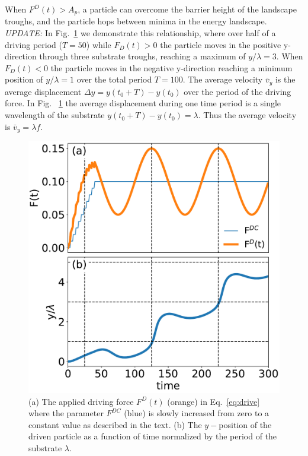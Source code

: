 \documentclass[twocolumn,preprintnumbers,amsmath,amssymb,aps,prx]{revtex4}
\begin{document}
When $F^D(t) > A_p$, a particle can 
overcome the barrier height of the landscape troughs,
and 
the particle hops between minima in the energy landscape.
{\it UPDATE:} 
In Fig.~\ref{fig:0} we demonstrate this relationship,
where over half of a driving period ($T = 50$) %
while $F_{D}(t) > 0 $ 
the particle moves
in the positive y-direction
through three
substrate troughs, reaching a maximum of $y/\lambda = 3$.
When $F_{D}(t) < 0 $
the particle moves in the negative y-direction
reaching a minimum position
of $y/\lambda = 1$
over the total period $T = 100$.
The average velocity $\bar{v}_y$
is the average displacement $\Delta y = y(t_0+T) - y(t_0)$
over the period of the driving force.
In Fig. ~\ref{fig:0}
the average displacement during one time period is a single wavelength
of the substrate $y(t_0+T) - y(t_0) = \lambda$.
Thus the average velocity 
is $\bar{v}_y = \lambda f$. %


\begin{center}
\begin{figure}[h!]
\centering
\includegraphics[width=\columnwidth]{single_particle.pdf}
\caption{(a) The applied driving force $F^D(t)$ (orange) in Eq.~\ref{eq:drive}
  where the parameter $F^{DC}$ (blue) is slowly increased from zero to a constant value
  as described in the text.  (b) 
  The $y-$position of the driven particle as a function of time %
  normalized by the period of the substrate $\lambda$.
  }
\label{fig:0}
\end{figure}
\end{center}
\end{document}
